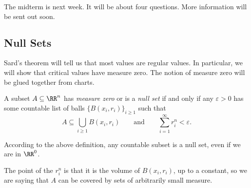 \documentclass[../notes.tex]{subfiles}
\begin{document}
The midterm is next week. It will be about four questions. More information will be sent out soon.

\subsection{Null Sets}
Sard's theorem will tell us that most values are regular values. In particular, we will show that critical values have measure zero. The notion of measure zero will be glued together from charts.
\begin{definition}
	A subset $A\subseteq\RR^n$ has \textit{measure zero} or is a \textit{null set} if and only if any $\varepsilon>0$ has some countable list of balls $\{B(x_i,r_i)\}_{i\ge1}$ such that
	\[A\subseteq\bigcup_{i\ge1}B(x_i,r_i)\qquad\text{and}\qquad\sum_{i=1}^\infty r_i^n<\varepsilon.\]
\end{definition}
\begin{example}
	According to the above definition, any countable subset is a null set, even if we are in $\RR^0$.
\end{example}
The point of the $r_i^n$ is that it is the volume of $B(x_i,r_i)$, up to a constant, so we are saying that $A$ can be covered by sets of arbitrarily small measure.
\end{document}
